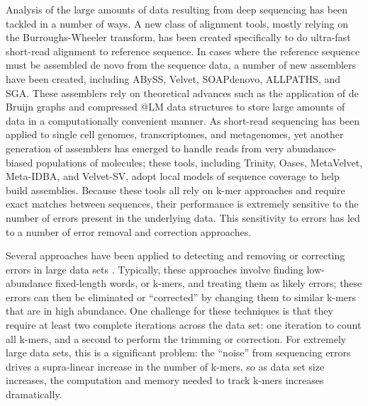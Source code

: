 \documentclass[10pt]{article}
\begin{document}
Analysis of the large amounts of data resulting from deep sequencing
has been tackled in a number of ways.  A new class of alignment tools,
mostly relying on the Burroughs-Wheeler transform, has been created
specifically to do ultra-fast short-read alignment to reference
sequence.  In cases where the reference sequence must be assembled de
novo from the sequence data, a number of new assemblers have been
created, including ABySS, Velvet, SOAPdenovo, ALLPATHS, and SGA.
These assemblers rely on theoretical advances such as the application
of de Bruijn graphs and compressed @LM data structures to store large
amounts of data in a computationally convenient manner.  As short-read
sequencing has been applied to single cell genomes, transcriptomes,
and metagenomes, yet another generation of assemblers has emerged to
handle reads from very abundance-biased populations of molecules;
these tools, including Trinity, Oases, MetaVelvet, Meta-IDBA, and
Velvet-SV, adopt local models of sequence coverage to help build
assemblies.  Because these tools all rely on k-mer approaches and
require exact matches between sequences, their performance is
extremely sensitive to the number of errors present in the underlying
data.  This sensitivity to errors has led to a number of error removal
and correction approaches.

Several approaches have been applied to detecting and removing or
correcting errors in large data sets \cite{pubmed21114842}.
Typically, these approaches involve finding low-abundance fixed-length
words, or k-mers, and treating them as likely errors; these errors can
then be eliminated or ``corrected'' by changing them to similar k-mers
that are in high abundance.  One challenge for these techniques is
that they require at least two complete iterations across the data
set: one iteration to count all k-mers, and a second to perform the
trimming or correction.  For extremely large data sets, this is a
significant problem: the ``noise'' from sequencing errors drives a
supra-linear increase in the number of k-mers, so as data set size
increases, the computation and memory needed to track k-mers increases
dramatically.
\end{document}
